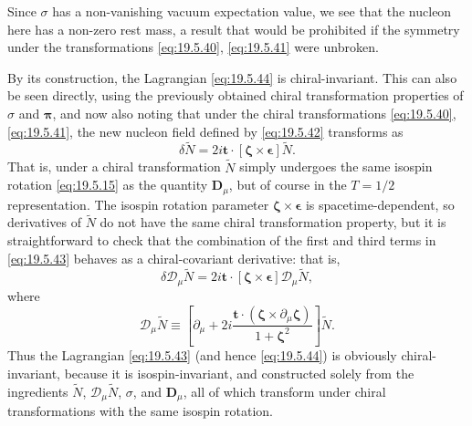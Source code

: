 Since $\sigma$ has a non-vanishing vacuum expectation value, we see that the nucleon here has a non-zero rest mass, a result that would be prohibited if the symmetry under the transformations \eqref{eq:19.5.40}, \eqref{eq:19.5.41} were unbroken.

By its construction, the Lagrangian \eqref{eq:19.5.44} is chiral-invariant. This can also be seen directly, using the previously obtained chiral transformation properties of $\sigma$ and $\boldsymbol{\pi}$, and now also noting that under the chiral transformations \eqref{eq:19.5.40}, \eqref{eq:19.5.41}, the new nucleon field defined by \eqref{eq:19.5.42} transforms as
\begin{equation}
\delta\widetilde N
=2i\boldsymbol t\cdot
[\boldsymbol{\zeta}\times\boldsymbol{\epsilon}]
\widetilde N.
\tag{19.5.45}\label{eq:19.5.45}
\end{equation}
That is, under a chiral transformation $\widetilde N$ simply undergoes the same isospin rotation \eqref{eq:19.5.15} as the quantity $\boldsymbol D_\mu$, but of course in the $T=1/2$ representation. The isospin rotation parameter $\boldsymbol{\zeta}\times\boldsymbol{\epsilon}$ is spacetime-dependent, so derivatives of $\widetilde N$ do not have the same chiral transformation property, but it is straightforward to check that the combination of the first and third terms in \eqref{eq:19.5.43} behaves as a chiral-covariant derivative: that is,
\begin{equation}
\delta\mathcal D_\mu\widetilde N
=2i\boldsymbol t\cdot
[\boldsymbol{\zeta}\times\boldsymbol{\epsilon}]
\mathcal D_\mu\widetilde N,
\tag{19.5.46}\label{eq:19.5.46}
\end{equation}
where
\begin{equation}
\mathcal D_\mu\widetilde N
\equiv
\left[
\partial_\mu
+2i\frac{\boldsymbol t\cdot
(\boldsymbol{\zeta}\times\partial_\mu\boldsymbol{\zeta})}
{1+\boldsymbol{\zeta}^2}
\right]\widetilde N.
\tag{19.5.47}\label{eq:19.5.47}
\end{equation}
Thus the Lagrangian \eqref{eq:19.5.43} (and hence \eqref{eq:19.5.44}) is obviously chiral-invariant, because it is isospin-invariant, and constructed solely from the ingredients $\widetilde N$, $\mathcal D_\mu\widetilde N$, $\sigma$, and $\boldsymbol D_\mu$, all of which transform under chiral transformations with the same isospin rotation.

